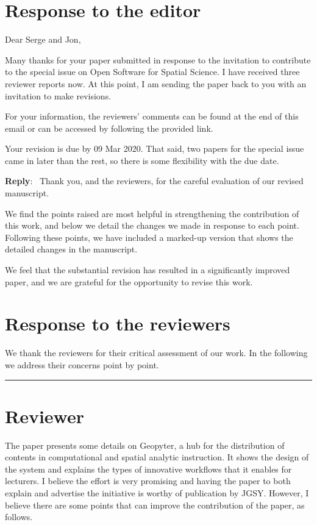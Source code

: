 \documentclass[11pt]{article}
\newcounter{reviewer}
\newcounter{point}[reviewer]
\newcommand{\reviewersection}{\stepcounter{reviewer} \bigskip \hrule
                  \section*{Reviewer \thereviewer}}
\newenvironment{reply}
   {\medskip \noindent \begin{sf}\textbf{Reply}:\  }
   {\medskip \end{sf}}
\begin{document}
\section*{Response to the editor}

Dear Serge and Jon,

Many thanks for your paper submitted in response to the invitation to contribute to the special issue on Open Software for Spatial Science. I have received three reviewer reports now. At this point, I am sending the paper back to you with an invitation to make revisions.

For your information, the reviewers' comments can be found at the end of this email or can be accessed by following the provided link.

Your revision is due by 09 Mar 2020. That said, two papers for the special issue came in later than the rest, so there is some flexibility with the due date.
  

\begin{reply}
  Thank you, and the reviewers, for the careful evaluation of our revised manuscript.

  We find the points raised are most helpful in strengthening the contribution of this work, and below we detail the changes we made in response to each point. Following these points, we have included a marked-up version that shows the
  detailed changes in the manuscript.

  We feel that the substantial revision has resulted in a significantly improved
  paper, and we are grateful for the opportunity to revise this work.

\end{reply}
\pagebreak
\section*{Response to the reviewers}
We thank the reviewers for their critical assessment of our work. 
In the following we address their concerns point by point. 

\reviewersection
The paper presents some details on Geopyter, a hub for the distribution of contents in computational and spatial analytic instruction. It shows the design of the system and explains the types of innovative workflows that it enables for lecturers. I believe the effort is very promising and having the paper to both explain and advertise the initiative is worthy of publication by JGSY. However, I believe there are some points that can improve the contribution of the paper, as follows.
\end{document}

